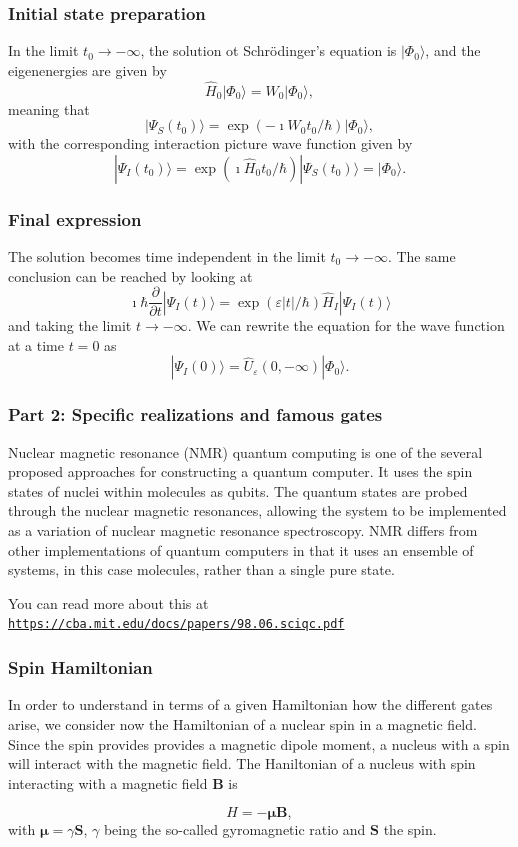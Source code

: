 \documentclass{beamer}
\begin{document}
\begin{frame}
\frametitle{Initial state preparation}

In the limit $t_0\rightarrow -\infty$, the solution ot Schrödinger's equation is
$|\Phi_0\rangle$, and the eigenenergies are given by 
\[
\hat{H}_0|\Phi_0\rangle=W_0|\Phi_0\rangle,
\]
meaning that 
\[
|\Psi_S(t_0)\rangle = \exp{(-\imath W_0t_0/\hbar)}|\Phi_0\rangle,
\]
with the corresponding interaction picture wave function given by
\[
|\Psi_I(t_0)\rangle = \exp{(\imath \hat{H}_0t_0/\hbar)}|\Psi_S(t_0)\rangle=|\Phi_0\rangle.
\]
\end{frame}

\begin{frame}
\frametitle{Final expression}

The solution becomes time independent in the limit $t_0\rightarrow -\infty$.
The same conclusion can be reached by looking at 
\[
\imath \hbar\frac{\partial }{\partial t}|\Psi_I(t)\rangle =
\exp{(\varepsilon |t|/\hbar)}\hat{H}_I|\Psi_I(t)\rangle 
\]
and taking the limit $t\rightarrow -\infty$.
We can rewrite the equation for the wave function at a time $t=0$ as
\[
|\Psi_I(0) \rangle = \hat{U}_{\varepsilon}(0,-\infty)|\Phi_0\rangle.
\]
\end{frame}

\begin{frame}
\frametitle{Part 2: Specific realizations and famous gates}

Nuclear magnetic resonance (NMR) quantum computing is one of the several
proposed approaches for constructing a quantum computer. It uses the
spin states of nuclei within molecules as qubits. The quantum states
are probed through the nuclear magnetic resonances, allowing the
system to be implemented as a variation of nuclear magnetic resonance
spectroscopy. NMR differs from other implementations of quantum
computers in that it uses an ensemble of systems, in this case
molecules, rather than a single pure state.

You can read more about this at \href{{https://cba.mit.edu/docs/papers/98.06.sciqc.pdf}}{\nolinkurl{https://cba.mit.edu/docs/papers/98.06.sciqc.pdf}}
\end{frame}

\begin{frame}
\frametitle{Spin Hamiltonian}

In order to understand in terms of a given Hamiltonian how the
different gates arise, we consider now the Hamiltonian of a nuclear
spin in a magnetic field. Since the spin provides provides a magnetic
dipole moment, a nucleus with a spin will interact with the magnetic
field. The Haniltonian of a nucleus with spin interacting with a
magnetic field $\bm{B}$ is

\[
H = -\bm{\mu}\bm{B},
\]
with $\bm{\mu}=\gamma\bm{S}$, $\gamma$ being the so-called gyromagnetic ratio and $\bm{S}$ the spin.
\end{frame}
\end{document}
